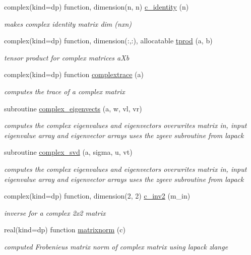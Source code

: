 \begin{DoxyCompactItemize}
complex(kind=dp) function, dimension(n, n) \hyperlink{namespaceolis__f90stdlib_a2ff3837ae1f9273552a2716064a46fce}{c\+\_\+identity} (n)
\begin{DoxyCompactList}\small\item\em makes complex identity matrix dim (nxn) \end{DoxyCompactList}\item 
complex(kind=dp) function, dimension(\+:,\+:), allocatable \hyperlink{namespaceolis__f90stdlib_af055cdf442d596810974e4f63eaeb119}{tprod} (a, b)
\begin{DoxyCompactList}\small\item\em tensor product for complex matrices a\+Xb \end{DoxyCompactList}\item 
complex(kind=dp) function \hyperlink{namespaceolis__f90stdlib_aaa6e9aabcf33a6f7052e1db5aa5dcf70}{complextrace} (a)
\begin{DoxyCompactList}\small\item\em computes the trace of a complex matrix \end{DoxyCompactList}\item 
subroutine \hyperlink{namespaceolis__f90stdlib_a71c5b363b52932a5c69053149ac8cc25}{complex\+\_\+eigenvects} (a, w, vl, vr)
\begin{DoxyCompactList}\small\item\em computes the complex eigenvalues and eigenvectors  overwrites matrix in, input eigenvalue array and eigenvector arrays uses the zgeev subroutine from lapack \end{DoxyCompactList}\item 
subroutine \hyperlink{namespaceolis__f90stdlib_a81e060e6ecfde9524a9732349a818db3}{complex\+\_\+svd} (a, sigma, u, vt)
\begin{DoxyCompactList}\small\item\em computes the complex eigenvalues and eigenvectors  overwrites matrix in, input eigenvalue array and eigenvector arrays uses the zgeev subroutine from lapack \end{DoxyCompactList}\item 
complex(kind=dp) function, dimension(2, 2) \hyperlink{namespaceolis__f90stdlib_a162dd5131a39a62d7b95e2ebca4664a4}{c\+\_\+inv2} (m\+\_\+in)
\begin{DoxyCompactList}\small\item\em inverse for a complex 2x2 matrix \end{DoxyCompactList}\item 
real(kind=dp) function \hyperlink{namespaceolis__f90stdlib_a43175b11cfecf961b5e6e597cfb2f848}{matrixnorm} (c)
\begin{DoxyCompactList}\small\item\em computed Frobenieus matrix norm of complex matrix using lapack zlange \end{DoxyCompactList}\end{DoxyCompactItemize}
